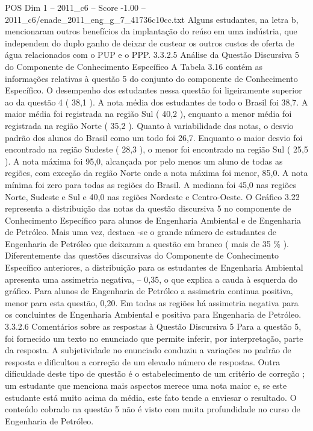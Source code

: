 \begin{textsample}{POS Dim 1 – 2011\_c6 – Score -1.00 – 2011\_c6/enade\_2011\_eng\_g\_7\_41736c10cc.txt}
Alguns estudantes, na letra b, mencionaram outros benefícios da implantação do reúso em uma indústria, que independem do duplo ganho de deixar de custear os outros custos de oferta de água relacionados com o PUP e o PPP. 3.3.2.5 Análise da Questão Discursiva 5 do Componente de Conhecimento Específico A Tabela 3.16 contém as informações relativas à questão 5 do conjunto do componente de Conhecimento Específico.
O desempenho dos estudantes nessa questão foi ligeiramente superior ao da questão 4 ( 38,1 ).
A nota média dos estudantes de todo o Brasil foi 38,7.
A maior média foi registrada na região Sul ( 40,2 ), enquanto a menor média foi registrada na região Norte ( 35,2 ).
Quanto à variabilidade das notas, o desvio padrão dos alunos do Brasil como um todo foi 26,7.
Enquanto o maior desvio foi encontrado na região Sudeste ( 28,3 ), o menor foi encontrado na região Sul ( 25,5 ).
A nota máxima foi 95,0, alcançada por pelo menos um aluno de todas as regiões, com exceção da região Norte onde a nota máxima foi menor, 85,0.
A nota mínima foi zero para todas as regiões do Brasil.
A mediana foi 45,0 nas regiões Norte, Sudeste e Sul e 40,0 nas regiões Nordeste e Centro-Oeste.
O Gráfico 3.22 representa a distribuição das notas da questão discursiva 5 no componente de Conhecimento Específico para alunos de Engenharia Ambiental e de Engenharia de Petróleo.
Mais uma vez, destaca -se o grande número de estudantes de Engenharia de Petróleo que deixaram a questão em branco ( mais de 35 \% ).
Diferentemente das questões discursivas do Componente de Conhecimento Específico anteriores, a distribuição para os estudantes de Engenharia Ambiental apresenta uma assimetria negativa, – 0,35, o que explica a cauda à esquerda do gráfico.
Para alunos de Engenharia de Petróleo a assimetria continua positiva, menor para esta questão, 0,20.
Em todas as regiões há assimetria negativa para os concluintes de Engenharia Ambiental e positiva para Engenharia de Petróleo. 3.3.2.6 Comentários sobre as respostas à Questão Discursiva 5 Para a questão 5, foi fornecido um texto no enunciado que permite inferir, por interpretação, parte da resposta.
A subjetividade no enunciado conduziu a variações no padrão de resposta e dificultou a correção de um elevado número de respostas.
Outra dificuldade deste tipo de questão é o estabelecimento de um critério de correção ; um estudante que menciona mais aspectos merece uma nota maior e, se este estudante está muito acima da média, este fato tende a enviesar o resultado.
O conteúdo cobrado na questão 5 não é visto com muita profundidade no curso de Engenharia de Petróleo.

\end{textsample}
